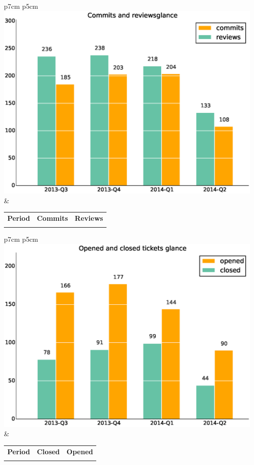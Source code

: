 \documentclass[a4wide,11pt]{report}
\begin{document}
\begin{tabular}{p{7cm} p{5cm}}
    \vspace{0pt} 
    \includegraphics[scale=.35]{figs/commitsglance.eps}
    & 
    \vspace{0pt}
    \begin{tabular}{l|r|r|}%
    \bfseries Period & \bfseries Commits & \bfseries Reviews %
    \csvreader[head to column names]{data/commitsglance.csv}{}%
    {\\ & \commits & \submitted}
    \end{tabular}
\end{tabular}

\begin{tabular}{p{7cm} p{5cm}}
    \vspace{0pt} 
    \includegraphics[scale=.35]{figs/closedglance.eps}
    & 
    \vspace{0pt}
    \begin{tabular}{l|r|r|}%
\bfseries Period & \bfseries Closed & \bfseries Opened
    \csvreader[head to column names]{data/closedglance.csv}{}%
    {\\ & \closed & \opened}
    \end{tabular}
\end{tabular}
\end{document}
